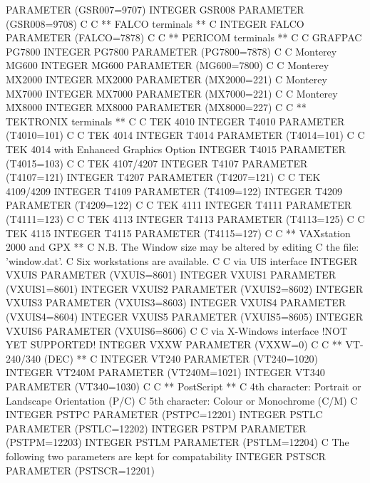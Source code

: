 \begin{XMP}
      PARAMETER (GSR007=9707)
      INTEGER    GSR008
      PARAMETER (GSR008=9708)
C
C  ** FALCO terminals  **
C
      INTEGER    FALCO
      PARAMETER (FALCO=7878)
C
C  ** PERICOM terminals  **
C
C     GRAFPAC    PG7800
      INTEGER    PG7800
      PARAMETER (PG7800=7878)
C
C     Monterey   MG600
      INTEGER    MG600
      PARAMETER (MG600=7800)
C
C     Monterey   MX2000
      INTEGER    MX2000
      PARAMETER (MX2000=221)
C     Monterey   MX7000
      INTEGER    MX7000
      PARAMETER (MX7000=221)
C
C     Monterey   MX8000
      INTEGER    MX8000
      PARAMETER (MX8000=227)
C
C  ** TEKTRONIX terminals  **
C
C     TEK 4010
      INTEGER    T4010
      PARAMETER (T4010=101)
C
C     TEK 4014
      INTEGER    T4014
      PARAMETER (T4014=101)
C
C     TEK 4014 with Enhanced Graphics Option
      INTEGER    T4015
      PARAMETER (T4015=103)
C
C     TEK 4107/4207
      INTEGER    T4107
      PARAMETER (T4107=121)
      INTEGER    T4207
      PARAMETER (T4207=121)
C
C     TEK 4109/4209
      INTEGER    T4109
      PARAMETER (T4109=122)
      INTEGER    T4209
      PARAMETER (T4209=122)
C
C     TEK 4111
      INTEGER    T4111
      PARAMETER (T4111=123)
C
C     TEK 4113
      INTEGER    T4113
      PARAMETER (T4113=125)
C
C     TEK 4115
      INTEGER    T4115
      PARAMETER (T4115=127)
C
C **  VAXstation 2000 and GPX  **
C     N.B. The Window size may be altered by editing
C          the file: 'window.dat'.
C          Six workstations are available.
C
C     via UIS interface
      INTEGER    VXUIS
      PARAMETER (VXUIS=8601)
      INTEGER    VXUIS1
      PARAMETER (VXUIS1=8601)
      INTEGER    VXUIS2
      PARAMETER (VXUIS2=8602)
      INTEGER    VXUIS3
      PARAMETER (VXUIS3=8603)
      INTEGER    VXUIS4
      PARAMETER (VXUIS4=8604)
      INTEGER    VXUIS5
      PARAMETER (VXUIS5=8605)
      INTEGER    VXUIS6
      PARAMETER (VXUIS6=8606)
C
C     via X-Windows interface     !NOT YET SUPPORTED!
      INTEGER    VXXW
      PARAMETER (VXXW=0)
C
C **  VT-240/340 (DEC)  **
C
      INTEGER    VT240
      PARAMETER (VT240=1020)
      INTEGER    VT240M
      PARAMETER (VT240M=1021)
      INTEGER    VT340
      PARAMETER (VT340=1030)
C
C  ** PostScript  **
C     4th character: Portrait or Landscape Orientation (P/C)
C     5th character: Colour or Monochrome (C/M)
C
      INTEGER    PSTPC
      PARAMETER (PSTPC=12201)
      INTEGER    PSTLC
      PARAMETER (PSTLC=12202)
      INTEGER    PSTPM
      PARAMETER (PSTPM=12203)
      INTEGER    PSTLM
      PARAMETER (PSTLM=12204)
C     The following two parameters are kept for compatability
      INTEGER    PSTSCR
      PARAMETER (PSTSCR=12201)

\end{XMP}
